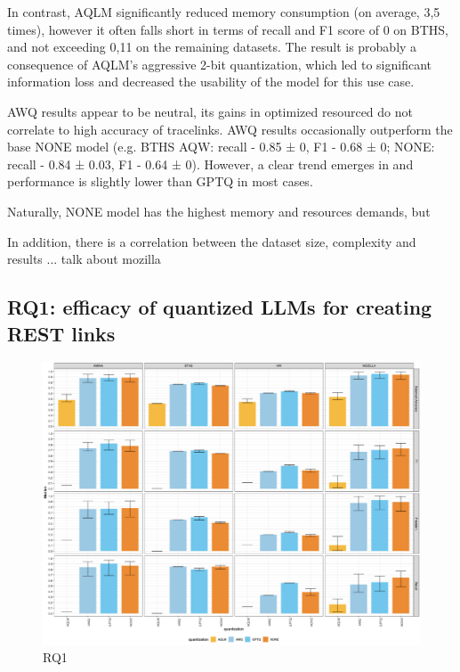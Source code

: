 \documentclass[conference]{IEEEtran}
\begin{document}
In contrast, AQLM significantly reduced memory consumption (on average, 3,5 times), however it often falls short in terms of recall and F1 score of 0 on BTHS, and not exceeding 0,11 on the remaining datasets. The result is probably a consequence of AQLM's aggressive 2-bit quantization, which led to significant information loss and decreased the usability of the model for this use case.

AWQ results appear to be neutral, its gains in optimized resourced do not correlate to high accuracy of tracelinks. AWQ results occasionally outperform the base NONE model (e.g. BTHS AQW: recall - 0.85 ± 0, F1 - 0.68 ± 0; NONE: recall - 0.84 ± 0.03, F1 - 0.64 ± 0). However, a clear trend emerges in  and performance is slightly lower than GPTQ in most cases.


Naturally, NONE model has the highest memory and resources demands, but

 In addition, there is a correlation between the dataset size, complexity and results ...
talk about mozilla 


 

\subsection{\textbf{RQ1:} efficacy of quantized LLMs for creating REST links}

\begin{figure}[H]
    \centering
    \includegraphics[width=0.99\columnwidth]{images/RQ1_quant_comparison.png}
    \caption{RQ1}
    \label{fig:rq1}
\end{figure}
\end{document}
